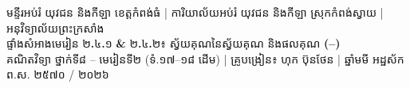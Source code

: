 \documentclass[a4paper,10pt]{article}
\newcommand{\en}[1]{{\TimesEn #1}}
\newcommand{\enbf}[1]{{\TimesEn\bfseries #1}}
\newcommand{\cnum}[1]{\mbox{\fontsize{10pt}{12pt}\selectfont\ding{\numexpr181+#1\relax}}}
\newcommand{\khmflourish}{{\Tacteing\fontsize{32pt}{13pt}\selectfont\raisebox{-4pt}{3}}}
\begin{document}
\begin{tcolorbox}[
  enhanced, sharp corners, colback=white, colframe=black,
  boxrule=1.5pt, borderline={0.6pt}{2.2pt}{black},
  boxsep=1pt, top=14pt, bottom=14pt, left=7pt, right=7pt
]
  \begin{center}
    {\fontsize{8.5pt}{11.8pt}\selectfont មន្ទីរអប់រំ យុវជន និងកីឡា ខេត្តកំពង់ធំ \en{|} ការិយាល័យអប់រំ យុវជន និងកីឡា ស្រុកកំពង់ស្វាយ \en{|} អនុវិទ្យាល័យព្រះក្រសាំង}\\[4pt]
    {\muol\fontsize{11.4pt}{17.0pt}\selectfont ផ្ទាំងសំអាងមេរៀន ២\enbf{.}៤\enbf{.}១ \enbf{\&} ២\enbf{.}៤\enbf{.}២៖ ស្វ័យគុណនៃស្វ័យគុណ និងផលគុណ \enbf{(}\cnum{1}\enbf{--}\cnum{5}\enbf{)}}\\[4pt]
    {\fontsize{7.9pt}{11.2pt}\selectfont គណិតវិទ្យា ថ្នាក់ទី៨ \en{--} មេរៀនទី២ (ទំ.១៧\en{--}១៨ ដើម) \en{|} គ្រូបង្រៀន៖ ហុក ប៊ុនថែន \en{|} ឆ្នាំមមី អដ្ឋស័ក ព.ស. ២៥៧០ \en{/} ២០២៦}\\[5pt]
    \khmflourish
  \end{center}
  \vspace{12pt}


\end{tcolorbox}
\end{document}
